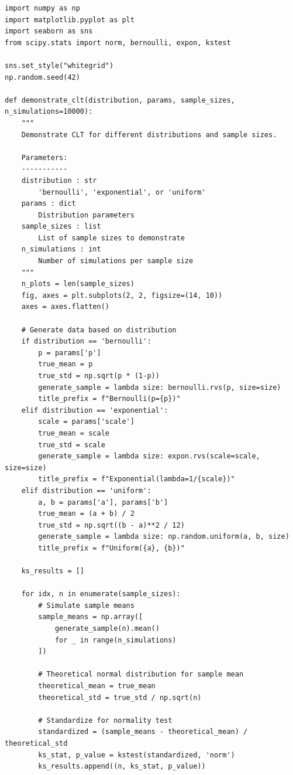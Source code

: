 \lstset{language=Python, caption=Demonstrating the Central Limit Theorem, label=lst:clt_demo}
\begin{lstlisting}
import numpy as np
import matplotlib.pyplot as plt
import seaborn as sns
from scipy.stats import norm, bernoulli, expon, kstest

sns.set_style("whitegrid")
np.random.seed(42)

def demonstrate_clt(distribution, params, sample_sizes, n_simulations=10000):
    """
    Demonstrate CLT for different distributions and sample sizes.

    Parameters:
    -----------
    distribution : str
        'bernoulli', 'exponential', or 'uniform'
    params : dict
        Distribution parameters
    sample_sizes : list
        List of sample sizes to demonstrate
    n_simulations : int
        Number of simulations per sample size
    """
    n_plots = len(sample_sizes)
    fig, axes = plt.subplots(2, 2, figsize=(14, 10))
    axes = axes.flatten()

    # Generate data based on distribution
    if distribution == 'bernoulli':
        p = params['p']
        true_mean = p
        true_std = np.sqrt(p * (1-p))
        generate_sample = lambda size: bernoulli.rvs(p, size=size)
        title_prefix = f"Bernoulli(p={p})"
    elif distribution == 'exponential':
        scale = params['scale']
        true_mean = scale
        true_std = scale
        generate_sample = lambda size: expon.rvs(scale=scale, size=size)
        title_prefix = f"Exponential(lambda=1/{scale})"
    elif distribution == 'uniform':
        a, b = params['a'], params['b']
        true_mean = (a + b) / 2
        true_std = np.sqrt((b - a)**2 / 12)
        generate_sample = lambda size: np.random.uniform(a, b, size)
        title_prefix = f"Uniform({a}, {b})"

    ks_results = []

    for idx, n in enumerate(sample_sizes):
        # Simulate sample means
        sample_means = np.array([
            generate_sample(n).mean()
            for _ in range(n_simulations)
        ])

        # Theoretical normal distribution for sample mean
        theoretical_mean = true_mean
        theoretical_std = true_std / np.sqrt(n)

        # Standardize for normality test
        standardized = (sample_means - theoretical_mean) / theoretical_std
        ks_stat, p_value = kstest(standardized, 'norm')
        ks_results.append((n, ks_stat, p_value))


\end{lstlisting}
